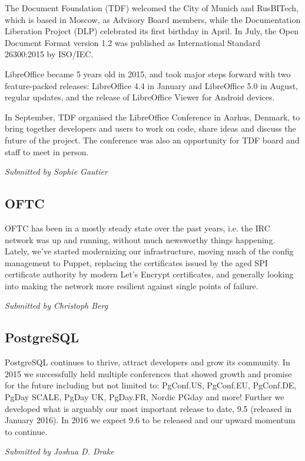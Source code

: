 \documentclass[letterpaper]{report}
\begin{document}
The Document Foundation (TDF) welcomed the City of Munich and RusBITech,
which is based in Moscow, as Advisory Board members, while the
Documentation Liberation Project (DLP) celebrated its first birthday in
April. In July, the Open Document Format version 1.2 was published as
International Standard 26300:2015 by ISO/IEC.

LibreOffice became 5 years old in 2015, and took major steps forward with
two feature-packed releases: LibreOffice 4.4 in January and LibreOffice 5.0
in August, regular updates, and the release of LibreOffice Viewer for
Android devices.

In September, TDF organised the LibreOffice Conference in Aarhus, Denmark,
to bring together developers and users to work on code, share ideas and
discuss the future of the project. The conference was also an opportunity
for TDF board and staff to meet in person.

{\em Submitted by Sophie Gautier}

\subsection{OFTC}

OFTC has been in a mostly steady state over the past years, i.e. the IRC
network was up and running, without much newsworthy things happening.
Lately, we've started modernizing our infrastructure, moving much of the
config management to Puppet, replacing the certificates issued by the aged
SPI certificate authority by modern Let's Encrypt certificates, and
generally looking into making the network more resilient against single
points of failure.

{\em Submitted by Christoph Berg}

\subsection{PostgreSQL}

PostgreSQL continues to thrive, attract developers and grow its community.
In 2015 we successfully held multiple conferences that showed growth and
promise for the future including but not limited to: PgConf.US, PgConf.EU,
PgConf.DE, PgDay SCALE, PgDay UK, PgDay.FR, Nordic PGday and more! Further
we developed what is arguably our most important release to date, 9.5
(released in January 2016). In 2016 we expect 9.6 to be released and our
upward momentum to continue.

{\em Submitted by Joshua D. Drake}
\end{document}
